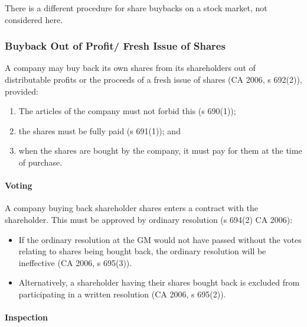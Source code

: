 \documentclass[
]{article}
\newenvironment{Shaded}{}{}
\newcommand{\NormalTok}[1]{#1}
\providecommand{\tightlist}{%
  \setlength{\itemsep}{0pt}\setlength{\parskip}{0pt}}
\begin{document}
\begin{Shaded}
\begin{Highlighting}[]
\NormalTok{There is a different procedure for share buybacks on a stock market, not considered here. }
\end{Highlighting}
\end{Shaded}

\hypertarget{buyback-out-of-profit-fresh-issue-of-shares}{%
\subsubsection{Buyback Out of Profit/ Fresh Issue of
Shares}\label{buyback-out-of-profit-fresh-issue-of-shares}}

A company may buy back its own shares from its shareholders out of
distributable profits or the proceeds of a fresh issue of shares (CA
2006, s 692(2)), provided:

\begin{enumerate}
\def\labelenumi{\arabic{enumi}.}
\tightlist
\item
  The articles of the company must not forbid this (s 690(1));
\item
  the shares must be fully paid (s 691(1)); and
\item
  when the shares are bought by the company, it must pay for them at the
  time of purchase.
\end{enumerate}

\hypertarget{voting}{%
\paragraph{Voting}\label{voting}}

A company buying back shareholder shares enters a contract with the
shareholder. This must be approved by ordinary resolution (s 694(2) CA
2006):

\begin{itemize}
\tightlist
\item
  If the ordinary resolution at the GM would not have passed without the
  votes relating to shares being bought back, the ordinary resolution
  will be ineffective (CA 2006, s 695(3)).
\item
  Alternatively, a shareholder having their shares bought back is
  excluded from participating in a written resolution (CA 2006, s
  695(2)).
\end{itemize}

\hypertarget{inspection}{%
\paragraph{Inspection}\label{inspection}}
\end{document}
